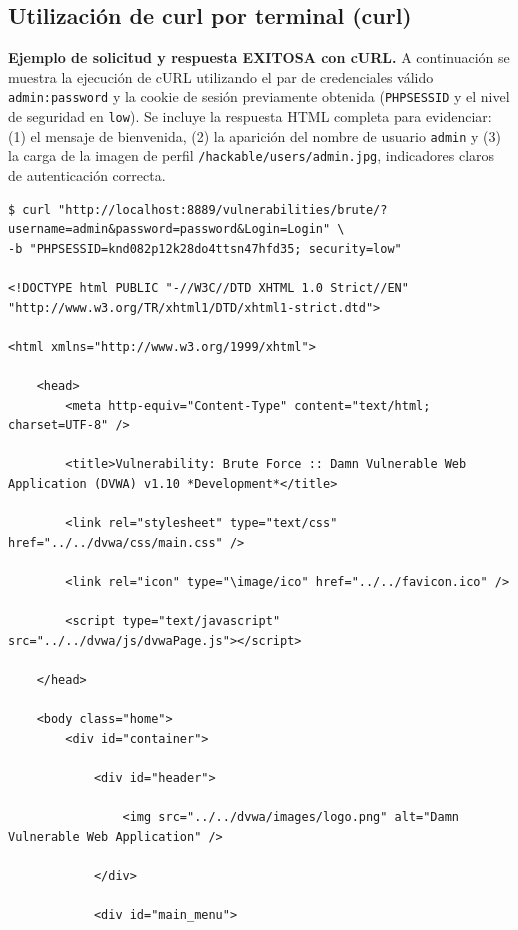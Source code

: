 \documentclass[letterpaper,12pt]{article}
\let\origsubsection\subsection
\renewcommand{\subsection}{\FloatBarrier\origsubsection}
\begin{document}
\subsection{Utilización de curl por terminal (curl)}

\noindent\textbf{Ejemplo de solicitud y respuesta EXITOSA con cURL.} A continuación se muestra la ejecución de cURL utilizando el par de credenciales válido \texttt{admin:password} y la cookie de sesión previamente obtenida (\texttt{PHPSESSID} y el nivel de seguridad en \texttt{low}). Se incluye la respuesta HTML completa para evidenciar: (1) el mensaje de bienvenida, (2) la aparición del nombre de usuario \texttt{admin} y (3) la carga de la imagen de perfil \texttt{/hackable/users/admin.jpg}, indicadores claros de autenticación correcta.
\begin{verbatim}
$ curl "http://localhost:8889/vulnerabilities/brute/?username=admin&password=password&Login=Login" \
-b "PHPSESSID=knd082p12k28do4ttsn47hfd35; security=low"

<!DOCTYPE html PUBLIC "-//W3C//DTD XHTML 1.0 Strict//EN" "http://www.w3.org/TR/xhtml1/DTD/xhtml1-strict.dtd">

<html xmlns="http://www.w3.org/1999/xhtml">

	<head>
		<meta http-equiv="Content-Type" content="text/html; charset=UTF-8" />

		<title>Vulnerability: Brute Force :: Damn Vulnerable Web Application (DVWA) v1.10 *Development*</title>

		<link rel="stylesheet" type="text/css" href="../../dvwa/css/main.css" />

		<link rel="icon" type="\image/ico" href="../../favicon.ico" />

		<script type="text/javascript" src="../../dvwa/js/dvwaPage.js"></script>

	</head>

	<body class="home">
		<div id="container">

			<div id="header">

				<img src="../../dvwa/images/logo.png" alt="Damn Vulnerable Web Application" />

			</div>

			<div id="main_menu">


\end{verbatim}
\end{document}
